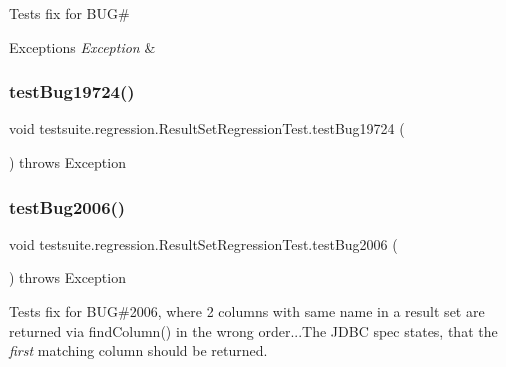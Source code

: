 Tests fix for B\+UG\#


\begin{DoxyExceptions}{Exceptions}
{\em Exception} & \\
\hline
\end{DoxyExceptions}
\mbox{\label{classtestsuite_1_1regression_1_1_result_set_regression_test_a6e94637bdaa705a841b6250c5a1c74e3}} 
\subsubsection{\texorpdfstring{test\+Bug19724()}{testBug19724()}}
{\footnotesize\ttfamily void testsuite.\+regression.\+Result\+Set\+Regression\+Test.\+test\+Bug19724 (\begin{DoxyParamCaption}{ }\end{DoxyParamCaption}) throws Exception}

\mbox{\label{classtestsuite_1_1regression_1_1_result_set_regression_test_a629011171ee3f908eb188d2f9ad1ea35}} 
\subsubsection{\texorpdfstring{test\+Bug2006()}{testBug2006()}}
{\footnotesize\ttfamily void testsuite.\+regression.\+Result\+Set\+Regression\+Test.\+test\+Bug2006 (\begin{DoxyParamCaption}{ }\end{DoxyParamCaption}) throws Exception}

Tests fix for B\+UG\#2006, where 2 columns with same name in a result set are returned via find\+Column() in the wrong order...The J\+D\+BC spec states, that the {\itshape first} matching column should be returned.


